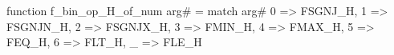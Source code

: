 function f_bin_op_H_of_num arg# = match arg# {
  0 => FSGNJ_H,
  1 => FSGNJN_H,
  2 => FSGNJX_H,
  3 => FMIN_H,
  4 => FMAX_H,
  5 => FEQ_H,
  6 => FLT_H,
  _ => FLE_H
}
